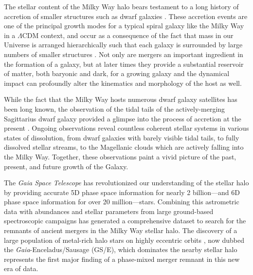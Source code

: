 The stellar content of the Milky Way halo bears testament to a long history of accretion of smaller structures such as dwarf galaxies \parencite{helmi20,deason24}. These accretion events are one of the principal growth modes for a typical spiral galaxy like the Milky Way in a $\Lambda$CDM context, and occur as a consequence of the fact that mass in our Universe is arranged hierarchically such that each galaxy is surrounded by large numbers of smaller structures \parencite{white78,searle78,bullock05,cooper10}. Not only are mergers an important ingredient in the formation of a galaxy, but at later times they provide a substantial reservoir of matter, both baryonic and dark, for a growing galaxy and the dynamical impact can profoundly alter the kinematics and morphology of the host as well. 

While the fact that the Milky Way hosts numerous dwarf galaxy satellites has been long known, the observation of the tidal tails of the actively-merging Sagittarius dwarf galaxy provided a glimpse into the process of accretion at the present \parencite{ibata94,belokurov06}. Ongoing observations reveal countless coherent stellar systems in various states of dissolution, from dwarf galaxies with barely visible tidal tails, to fully dissolved stellar streams, to the Magellanic clouds which are actively falling into the Milky Way. Together, these observations paint a vivid picture of the past, present, and future growth of the Galaxy.

The \textit{Gaia Space Telescope} \parencite{gaia} has revolutionized our understanding of the stellar halo by providing accurate 5D phase space information for nearly 2 billion---and 6D phase space information for over 20 million---stars. Combining this astrometric data with abundances and stellar parameters from large ground-based spectroscopic campaigns has generated a comprehensive dataset to search for the remnants of ancient mergers in the Milky Way stellar halo. The discovery of a large population of metal-rich halo stars on highly eccentric orbits \parencite{belokurov18,haywood18,helmi18}, now dubbed the \textit{Gaia}-Enceladus/Sausage (GS/E), which dominates the nearby stellar halo represents the first major finding of a phase-mixed merger remnant in this new era of data.

